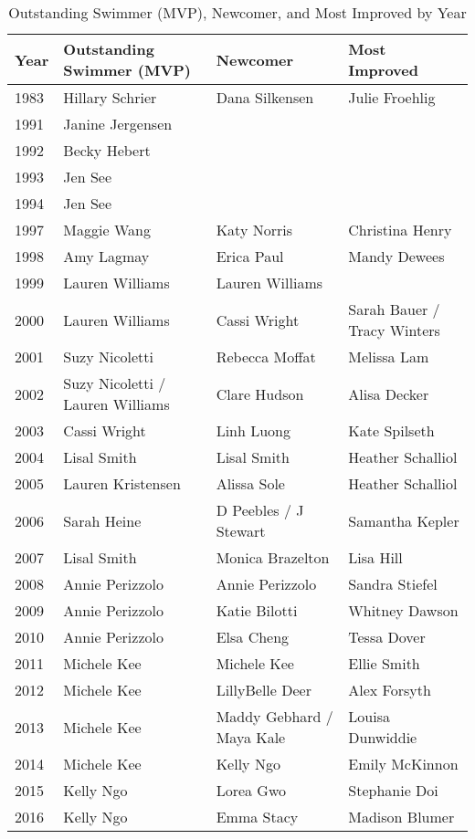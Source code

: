 \begin{table}[htbp]
\centering
\caption*{Outstanding Swimmer (MVP), Newcomer, and Most Improved by Year}
\scriptsize
\begin{tabular}{llll}
\toprule
Year & Outstanding Swimmer (MVP) & Newcomer & Most Improved \\
\midrule
1983 & Hillary Schrier & Dana Silkensen & Julie Froehlig \\
1991 & Janine Jergensen & & \\
1992 & Becky Hebert & & \\
1993 & Jen See & & \\
1994 & Jen See & & \\
1997 & Maggie Wang & Katy Norris & Christina Henry \\
1998 & Amy Lagmay & Erica Paul & Mandy Dewees \\
1999 & Lauren Williams & Lauren Williams & \\
2000 & Lauren Williams & Cassi Wright & Sarah Bauer / Tracy Winters \\
2001 & Suzy Nicoletti & Rebecca Moffat & Melissa Lam \\
2002 & Suzy Nicoletti / Lauren Williams & Clare Hudson & Alisa Decker \\
2003 & Cassi Wright & Linh Luong & Kate Spilseth \\
2004 & Lisal Smith & Lisal Smith & Heather Schalliol \\
2005 & Lauren Kristensen & Alissa Sole & Heather Schalliol \\
2006 & Sarah Heine & D Peebles / J Stewart & Samantha Kepler \\
2007 & Lisal Smith & Monica Brazelton & Lisa Hill \\
2008 & Annie Perizzolo & Annie Perizzolo & Sandra Stiefel \\
2009 & Annie Perizzolo & Katie Bilotti & Whitney Dawson \\
2010 & Annie Perizzolo & Elsa Cheng & Tessa Dover \\
2011 & Michele Kee & Michele Kee & Ellie Smith \\
2012 & Michele Kee & LillyBelle Deer & Alex Forsyth \\
2013 & Michele Kee & Maddy Gebhard / Maya Kale & Louisa Dunwiddie \\
2014 & Michele Kee & Kelly Ngo & Emily McKinnon \\
2015 & Kelly Ngo & Lorea Gwo & Stephanie Doi \\
2016 & Kelly Ngo & Emma Stacy & Madison Blumer \\

\end{tabular}
\end{table}
